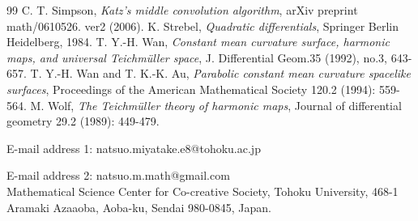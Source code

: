 \documentclass[12pt]{article}
\theoremstyle{definition}
\begin{document}
\begin{thebibliography}{99}
 C. T. Simpson, {\it Katz's middle convolution algorithm}, arXiv preprint math/0610526. ver2 (2006).
 K. Strebel, {\it Quadratic differentials}, Springer Berlin Heidelberg, 1984.
 T. Y.-H. Wan, {\it Constant mean curvature surface, harmonic maps, and universal Teichm\"uller space}, J. Differential Geom.35 (1992), no.3, 643-657.
 T. Y.-H. Wan and T. K.-K. Au, {\it Parabolic constant mean curvature spacelike surfaces}, Proceedings of the American Mathematical Society 120.2 (1994): 559-564.
 M. Wolf, {\it The Teichm\"uller theory of harmonic maps}, Journal of differential geometry 29.2 (1989): 449-479.
\end{thebibliography}
\noindent
E-mail address 1: natsuo.miyatake.e8@tohoku.ac.jp

\noindent
E-mail address 2: natsuo.m.math@gmail.com \\

\noindent
Mathematical Science Center for Co-creative Society, Tohoku University, 468-1 Aramaki Azaaoba, Aoba-ku, Sendai 980-0845, Japan.
\end{document}
